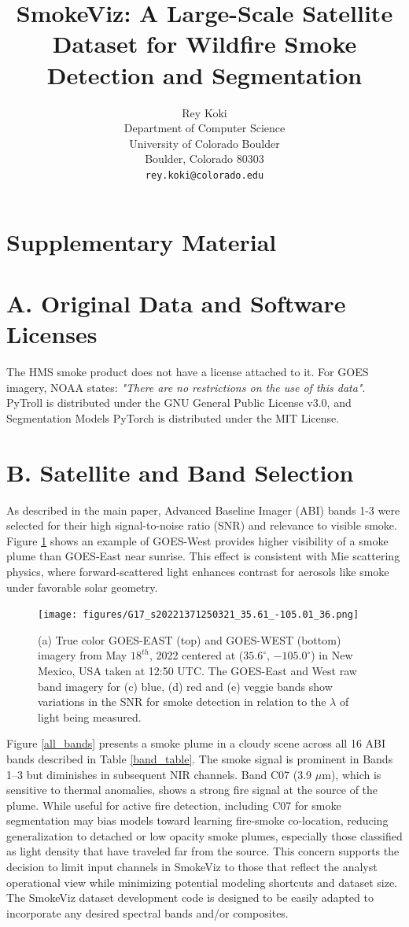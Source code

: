 \documentclass{article}
\title{SmokeViz: A Large-Scale Satellite Dataset for Wildfire Smoke Detection and Segmentation}
\author{%
  Rey Koki\\%
  Department of Computer Science\\
  University of Colorado Boulder\\
  Boulder, Colorado 80303\\
  \texttt{rey.koki@colorado.edu} \\
}
\begin{document}
\appendix

\section{Supplementary Material}

\section{A. Original Data and Software Licenses}

The HMS smoke product does not have a license attached to it. For GOES imagery, NOAA states: \emph{"There are no restrictions on the use of this data"}. PyTroll is distributed under the GNU General Public License v3.0, and Segmentation Models PyTorch is distributed under the MIT License.

\section{B. Satellite and Band Selection}


As described in the main paper, Advanced Baseline Imager (ABI) bands 1-3 were selected for their high signal-to-noise ratio (SNR) and relevance to visible smoke. Figure \ref{G16_vs_G17} shows an example of GOES-West provides higher visibility of a smoke plume than GOES-East near sunrise. This effect is consistent with Mie scattering physics, where forward-scattered light enhances contrast for aerosols like smoke under favorable solar geometry.

\setcounter{figure}{9}

\begin{figure}[!htb]
    \centering
    \texttt{[image: figures/G17\_s20221371250321\_35.61\_-105.01\_36.png]}
    \caption{(a) True color GOES-EAST (top) and GOES-WEST (bottom) imagery from May \(18^{th}\), 2022 centered at (\(35.6^{\circ}\), \(-105.0^{\circ}\)) in New Mexico, USA taken at 12:50 UTC. The GOES-East and West raw band imagery for (c) blue, (d) red and (e) veggie bands show variations in the SNR for smoke detection in relation to the \(\lambda\) of light being measured.}\label{G16_vs_G17}
\end{figure}

Figure \ref{all_bands} presents a smoke plume in a cloudy scene across all 16 ABI bands described in Table \ref{band_table}. The smoke signal is prominent in Bands 1–3 but diminishes in subsequent NIR channels. Band C07 (3.9 \(\mu\)m), which is sensitive to thermal anomalies, shows a strong fire signal at the source of the plume. While useful for active fire detection, including C07 for smoke segmentation may bias models toward learning fire-smoke co-location, reducing generalization to detached or low opacity smoke plumes, especially those classified as light density that have traveled far from the source. This concern supports the decision to limit input channels in SmokeViz to those that reflect the analyst operational view while minimizing potential modeling shortcuts and dataset size. The SmokeViz dataset development code is designed to be easily adapted to incorporate any desired spectral bands and/or composites.
\end{document}
